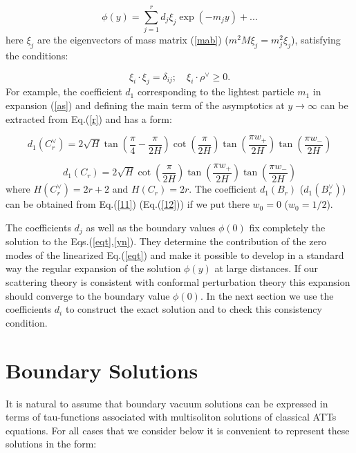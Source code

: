 \documentclass[a4paper,12pt,titlepage,final]{article}
\begin{document}
\begin{equation}
\phi (y)=\sum_{j=1}^{r}d_{j}\xi _{j}\exp (-m_{j}y)+...  \label{as}
\end{equation}
here $\xi _{j}$ are the eigenvectors of mass matrix (\ref{mab}) ($m^{2}M\xi
_{j}=m_{j}^{2}\xi _{j}$), satisfying the conditions:

\begin{equation}
\xi _{i}\cdot \xi _{j}=\delta _{ij};\quad \xi _{i}\cdot \rho ^{\vee }\geq 0.
\label{mv}
\end{equation}
For example, the coefficient $d_{1}$ corresponding to the lightest particle
$m_{1}$ in expansion (\ref{as}) and defining the main term of the
asymptotics
at $y\rightarrow \infty $ can be extracted from Eq.(\ref{r}) and has a form:

\begin{equation}
d_{1}(C_{r}^{\vee })=2\sqrt{H}\tan \left( \frac{\pi }{4}-\frac{\pi }{2H}
\right) \cot \left( \frac{\pi }{2H}\right) \tan \left( \frac{\pi w_{+}}{2H}
\right) \tan \left( \frac{\pi w_{-}}{2H}\right)  \label{11}
\end{equation}

\begin{equation}
d_{1}(C_{r})=2\sqrt{H}\cot \left( \frac{\pi }{2H}\right)
\tan \left( \frac{\pi w_{+}}{2H}\right)
\tan \left( \frac{\pi w_{-}}{2H}\right)  \label{12}
\end{equation}
where $H(C_{r}^{\vee })=2r+2$ and $H(C_{r})=2r$. The coefficient
$d_{1}(B_{r})$ ($d_{1}(B_{r}^{\vee })$) can be obtained from Eq.(\ref{11})
(Eq.(\ref{12})) if we put there $w_{0}=0$ ($w_{0}=1/2$).

The coefficients $d_{j}$ as well as the boundary values $\phi (0)$ fix
completely the solution to the Eqs.(\ref{eqt},\ref{yn}). They determine the
contribution of the zero modes of the linearized Eq.(\ref{eqt}) and make it
possible to develop in a standard way the regular expansion of the solution
$\phi (y)$ at large distances. If our scattering theory is consistent with
conformal perturbation theory this expansion should converge to the boundary
value $\phi (0)$. In the next section we use the coefficients $d_{i}$ to
construct the exact solution and to check this consistency condition.

\section{Boundary Solutions}

It is natural to assume that boundary vacuum solutions can be expressed in
terms of tau-functions associated with multisoliton solutions of classical
ATTs equations. For all cases that we consider below it is convenient to
represent these solutions in the form:
\end{document}
